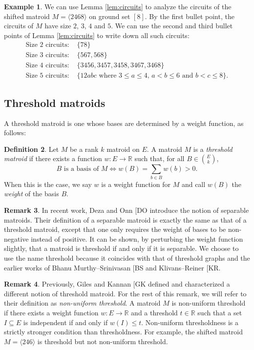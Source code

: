 \documentclass[10pt,a4paper]{amsart}
\makeatletter
\let\laneX@cite\cite
\renewcommand{\cite}{\protect\laneX@citenew}
\newcommand{\laneX@citenew}{\@ifnextchar[{\laneX@cite@a}{\laneX@cite@b}}
\def\laneX@cite@b#1{\laneX@cite{#1}}
\def\laneX@cite@a[#1]{\@ifnextchar[{\laneX@cite@c{#1}}{\laneX@cite@d{#1}}}
\def\laneX@cite@d#1#2{\laneX@cite[#1]{#2}}
\def\laneX@cite@c#1[#2]#3{[\unskip #1 \csname b@#3\endcsname, #2]}
\theoremstyle{definition}
\newtheorem{defn}{Definition}[section]
\newtheorem{remark}[defn]{Remark}
\newtheorem{example}[defn]{Example}
\theoremstyle{plain}
\newcommand{\R}{\mathbb{R}}
\makeatother
\begin{document}
\begin{example}
  We can use Lemma \ref{lem:circuits} to analyze the circuits of the shifted matroid $M=\langle 2468\rangle$ on ground set $[8]$. By the first bullet point, the circuits of $M$ have size $2$, $3$, $4$ and $5$. We can use the second and third bullet points of Lemma \ref{lem:circuits} to write down all such circuits:
  \begin{align*}
    \text{Size $2$ circuits: }& \{78\}\\
    \text{Size $3$ circuits: }& \{567, 568\}\\
    \text{Size $4$ circuits: }& \{3456,3457,3458,3467,3468\}\\
    \text{Size $5$ circuits: }& \{12abc \text{ where $3\leq a \leq 4$, $a< b \leq 6$ and $b< c \leq 8$}\}.
  \end{align*}
\end{example}

\subsection{Threshold matroids}
A threshold matroid is one whose bases are determined by a weight function, as follows:
\begin{defn}\label{def:thresh}
Let $M$ be a rank $k$ matroid on $E$. A matroid $M$ is a \emph{threshold matroid} if there exists a function $w:E\to \R$ such that, for all $B\in \binom{E}{k}$,
\[\text{$B$ is a basis of $M$} \iff w(B)=\sum_{b\in B} w(b) > 0.\]
When this is the case, we say $w$ is a weight function for $M$ and call $w(B)$ the \emph{weight} of the basis $B$.
\end{defn}
\begin{remark}\label{rem:thresh}
In recent work, Deza and Onn \cite{DO} introduce the notion of separable matroids. Their definition of a separable matroid is exactly the same as that of a threshold matroid, except that one only requires the weight of bases to be non-negative instead of positive. It can be shown, by perturbing the weight function slightly, that a matroid is threshold if and only if it is separable. We choose to use the name threshold because it coincides with that of threshold graphs and the earlier works of Bhanu Murthy--Srinivasan \cite{BS} and Klivans--Reiner \cite{KR}.
\end{remark}

\begin{remark}
  \label{rem:GK}
Previously, Giles and Kannan \cite{GK} defined and characterized a different notion of threshold matroid. For the rest of this remark, we will refer to their definition as \emph{non-uniform threshold}. A matroid $M$ is non-uniform threshold if there exists a weight function $w:E\to \R$ and a threshold $t\in \R$ such that a set $I\subseteq E$ is independent if and only if $w(I)\leq t$. Non-uniform thresholdness is a strictly stronger condition than thresholdness. For example, the shifted matroid $M= \langle 246 \rangle$ is threshold but not non-uniform threshold.  
\end{remark}
\end{document}
